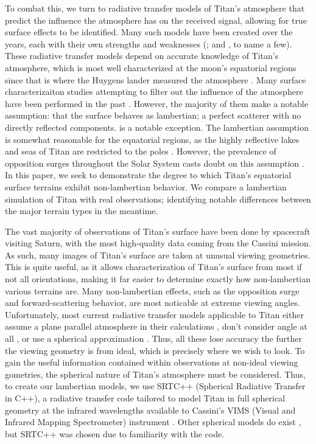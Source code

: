 \documentclass[twocolumn,linenumbers]{aastex631}
\begin{document}
To combat this, we turn to radiative transfer models of Titan's atmosphere that predict the influence the atmosphere has on the received signal, allowing for true surface effects to be identified. Many such models have been created over the years, each with their own strengths and weaknesses (\cite{Griffith2012, Xu2013, Barnes2018, Corlies2021, Rannou2021}; and \cite{EsSayeh2023}, to name a few). These radiative transfer models depend on accurate knowledge of Titan's atmosphere, which is most well characterized at the moon's equatorial regions since that is where the Huygens lander measured the atmosphere \citep{Tomasko2008}. Many surface characterizaiton studies attempting to filter out the influence of the atmosphere have been performed in the past \citep{Buratti2006, Soderblom2009, Kazeminejad2011, Brossier2018, EsSayeh2023, Solomonidou2024}. However, the majority of them make a notable assumption: that the surface behaves as lambertian; a perfect scatterer with no directly reflected components. \cite{Buratti2006} is a notable exception. The lambertian assumption is somewhat reasonable for the equatorial regions, as the highly reflective lakes and seas of Titan are restricted to the poles \citep{Hayes2016}. However, the prevalence of opposition surges throughout the Solar System casts doubt on this assumption \citep{Deau2009}. In this paper, we seek to demonstrate the degree to which Titan's equatorial surface terrains exhibit non-lambertian behavior. We compare a lambertian simulation of Titan with real observations; identifying notable differences between the major terrain types in the meantime.

The vast majority of observations of Titan's surface have been done by spacecraft visiting Saturn, with the most high-quality data coming from the Cassini mission. As such, many images of Titan's surface are taken at unusual viewing geometries. This is quite useful, as it allows characterization of Titan's surface from most if not all orientations, making it far easier to determine exactly how non-lambertian various terrains are. Many non-lambertian effects, such as the opposition surge \citep{Deau2009} and forward-scattering behavior, are most noticable at extreme viewing angles. Unfortunately, most current radiative transfer models applicable to Titan either assume a plane parallel atmosphere in their calculations \citep{Griffith2012, EsSayeh2023}, don't consider angle at all \citep{Rannou2021}, or use a spherical approximation \citep{Corlies2021}. Thus, all these lose accuracy the further the viewing geometry is from ideal, which is precisely where we wish to look. To gain the useful information contained within observations at non-ideal viewing gometries, the spherical nature of Titan's atmosphere must be considered. Thus, to create our lambertian models, we use SRTC++ (Spherical Radiative Transfer in C++), a radiative transfer code tailored to model Titan in full spherical geometry at the infrared wavelengths available to Cassini's VIMS (Visual and Infrared Mapping Spectrometer) instrument \citep{Barnes2018}. Other spherical models do exist \citep{Xu2013}, but SRTC++ was chosen due to familiarity with the code.
\end{document}
